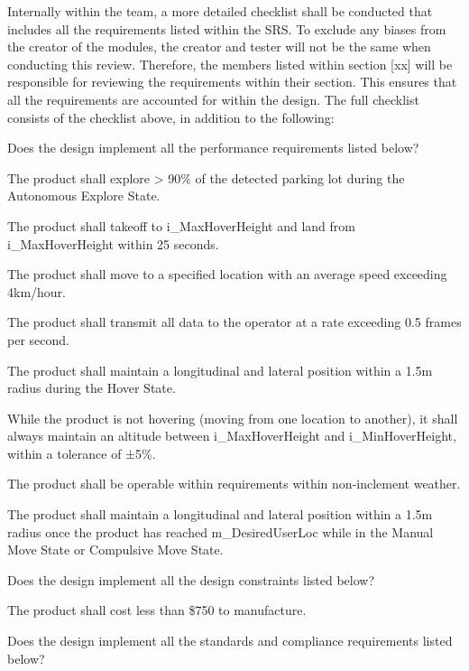 \documentclass[12pt, titlepage]{article}
\begin{document}
Internally within the team, a more detailed checklist shall be conducted that includes all the requirements listed within the SRS. To exclude any biases from the creator of the modules, the creator and tester will not be the same when conducting this review. Therefore, the members listed within section [xx] will be responsible for reviewing the requirements within their section. This ensures that all the requirements are accounted for within the design. The full checklist consists of the checklist above, in addition to the following: 

\begin{todolist}
\label{Design2_Checklist}
\item Does the design implement all the performance requirements listed below?
\begin{todolist}
    \item The product shall explore > 90\% of the detected parking lot during the Autonomous Explore State.
    \item The product shall takeoff to i\_MaxHoverHeight and land from i\_MaxHoverHeight within 25 seconds.
    \item The product shall move to a specified location with an average speed exceeding 4km/hour.
    \item The product shall transmit all data to the operator at a rate exceeding 0.5 frames per second.
    \item The product shall maintain a longitudinal and lateral position within a 1.5m radius during the Hover State.
    \item While the product is not hovering (moving from one location to another), it shall always maintain an altitude between i\_MaxHoverHeight and i\_MinHoverHeight, within a tolerance of ±5\%.
    \item The product shall be operable within requirements within non-inclement weather.
    \item The product shall maintain a longitudinal and lateral position within a 1.5m radius once the product has reached m\_DesiredUserLoc while in the Manual Move State or Compulsive Move State.
\end{todolist}
\item Does the design implement all the design constraints listed below?
\begin{todolist}
    \item The product shall cost less than \$750 to manufacture.
\end{todolist}
\item Does the design implement all the standards and compliance requirements listed below?

\end{todolist}
\end{document}
